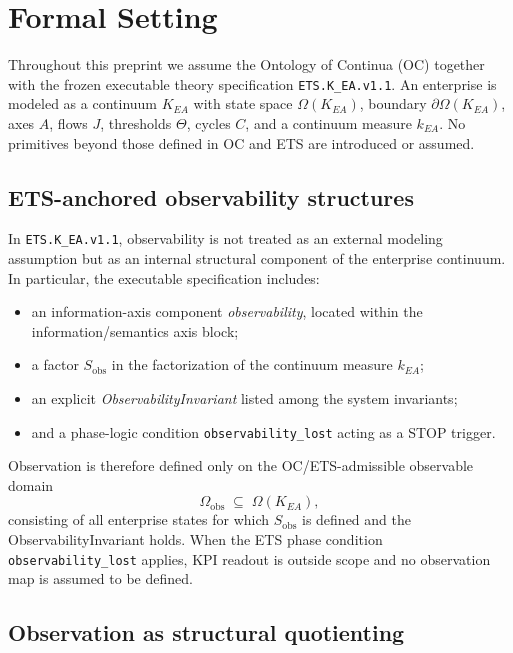 ﻿%

\section{Formal Setting}
\label{sec:formal-setting}

Throughout this preprint we assume the Ontology of Continua (OC) together with
the frozen executable theory specification \texttt{ETS.K\_EA.v1.1}.
An enterprise is modeled as a continuum \(K_{EA}\) with state space
\(\Omega(K_{EA})\), boundary \(\partial\Omega(K_{EA})\), axes \(A\), flows \(J\),
thresholds \(\Theta\), cycles \(C\), and a continuum measure \(k_{EA}\).
No primitives beyond those defined in OC and ETS are introduced or assumed.

\subsection{ETS-anchored observability structures}

In \texttt{ETS.K\_EA.v1.1}, observability is not treated as an external modeling
assumption but as an internal structural component of the enterprise continuum.
In particular, the executable specification includes:

\begin{itemize}[leftmargin=2em]
  \item an information-axis component \emph{observability}, located within the
        information/semantics axis block;
  \item a factor \(S_{\mathrm{obs}}\) in the factorization of the continuum
        measure \(k_{EA}\);
  \item an explicit \emph{ObservabilityInvariant} listed among the system
        invariants;
  \item and a phase-logic condition \texttt{observability\_lost} acting as a STOP
        trigger.
\end{itemize}

Observation is therefore defined only on the OC/ETS-admissible observable domain
\[
\Omega_{\mathrm{obs}} \;\subseteq\; \Omega(K_{EA}),
\]
consisting of all enterprise states for which \(S_{\mathrm{obs}}\) is defined
and the ObservabilityInvariant holds.
When the ETS phase condition \texttt{observability\_lost} applies, KPI readout is
outside scope and no observation map is assumed to be defined.

\subsection{Observation as structural quotienting}

